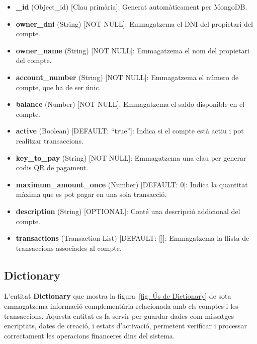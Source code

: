 \documentclass[a4paper,12pt,twoside]{ThesisStyle}
\begin{document}
\begin{itemize}
    \item \textbf{\_id} (Object\_id) [Clau primària]: Generat automàticament per MongoDB.
    \item \textbf{owner\_dni} (String) [NOT NULL]: Emmagatzema el DNI del propietari del compte.
    \item \textbf{owner\_name} (String) [NOT NULL]: Emmagatzema el nom del propietari del compte.
    \item \textbf{account\_number} (String) [NOT NULL]: Emmagatzema el número de compte, que ha de ser únic.
    \item \textbf{balance} (Number) [NOT NULL]: Emmagatzema el saldo disponible en el compte.
    \item \textbf{active} (Boolean) [DEFAULT: ``true'']: Indica si el compte està actiu i pot realitzar transaccions.
    \item \textbf{key\_to\_pay} (String) [NOT NULL]: Emmagatzema una clau per generar codis QR de pagament.
    \item \textbf{maximum\_amount\_once} (Number) [DEFAULT: 0]: Indica la quantitat màxima que es pot pagar en una sola transacció.
    \item \textbf{description} (String) [OPTIONAL]: Conté una descripció addicional del compte.
    \item \textbf{transactions} (Transaction List) [DEFAULT: []]: Emmagatzema la llista de transaccions associades al compte.
\end{itemize}


\clearpage


\subsection{Dictionary}
\label{subsec: Dictionary}

L'entitat \textbf{Dictionary} que mostra la figura~\ref{fig: Ús de Dictionary} de sota emmagatzema informació complementària relacionada amb els comptes i les transaccions. Aquesta entitat es fa servir per guardar dades com missatges encriptats, dates de creació, i estats d'activació, permetent verificar i processar correctament les operacions financeres dins del sistema.\\
\end{document}
